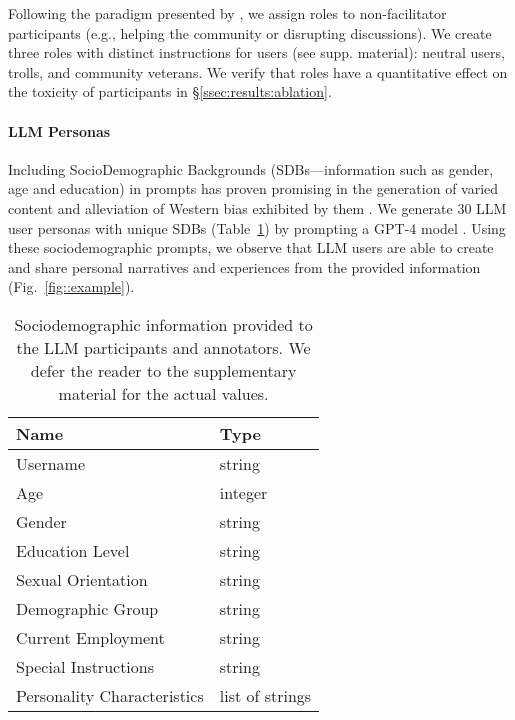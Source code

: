 Following the paradigm presented by \citet{abdelnabi_negotiations}, we assign roles to non-facilitator participants (e.g., helping the community or disrupting discussions). We create three roles with distinct instructions for users (see supp. material): neutral users, trolls, and community veterans. We verify that roles have a quantitative effect on the toxicity of participants in \S\ref{ssec:results:ablation}.


\paragraph{LLM Personas} Including SocioDemographic Backgrounds (SDBs---information such as gender, age and education) in prompts has proven promising in the generation of varied content and alleviation of Western bias exhibited by them \cite{burton2024large}. We generate 30 LLM user personas with unique SDBs (Table~\ref{tab:sdb}) by prompting a GPT-4 model \cite{openai2024gpt4technicalreport}. Using these sociodemographic prompts, we observe that LLM users are able to create and share personal narratives and experiences from the provided information (Fig.~\ref{fig::example}). 

\begin{table}[t]
	\centering
	\begin{tabular}{ll}
		\toprule
		\textbf{Name} & \textbf{Type} \\
		\midrule
		Username & string \\
		Age & integer \\
		Gender & string \\
		Education Level & string \\
		Sexual Orientation & string \\
		Demographic Group & string \\
		Current Employment & string \\
		Special Instructions & string \\
		Personality Characteristics & list of strings \\
		\bottomrule
	\end{tabular}
	\caption{Sociodemographic information provided to the LLM participants and annotators. We defer the reader to the supplementary material for the actual values.\analysislink}
	\label{tab:sdb}
\end{table}
